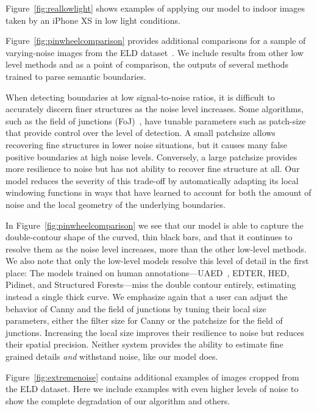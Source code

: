 \documentclass[main.tex]{subfiles}
\begin{document}

Figure~\ref{fig:reallowlight} shows examples of applying our model to indoor images taken by an iPhone XS in low light conditions. 

Figure~\ref{fig:pinwheelcomparison} provides additional comparisons for a sample of varying-noise images from the ELD dataset~\cite{wei2020physicsbased}. We include results from other low level methods and as a point of comparison, the outputs of several methods trained to parse semantic boundaries.

When detecting boundaries at low signal-to-noise ratios, it is difficult to accurately discern finer structures as the noise level increases. Some algorithms, such as the field of junctions (FoJ)~\cite{verbin2021field}, have tunable parameters such as patch-size that provide control over the level of detection. A small patchsize allows recovering fine structures in lower noise situations, but it causes many false positive boundaries at high noise levels. Conversely, a large patchsize provides more resilience to noise but has not ability to recover fine structure at all. Our model reduces the severity of this trade-off by automatically adapting its local windowing functions in ways that have learned to account for both the amount of noise and the local geometry of the underlying boundaries.

In Figure~\ref{fig:pinwheelcomparison} we see that our model is able to capture the double-contour shape of the curved, thin black bars, and that it continues to resolve them as the noise level increases, more than the other low-level methods. We also note that only the low-level models resolve this level of detail in the first place: The models trained on human annotations---UAED~\cite{zhou2023treasure}, EDTER, HED, Pidinet, and Structured Forests---miss the double contour entirely, estimating instead a single thick curve. We emphasize again that a user can adjust the behavior of Canny and the field of junctions by tuning their local size parameters, either the filter size for Canny or the patchsize for the field of junctions. Increasing the local size improves their resilience to noise but reduces their spatial precision. Neither system provides the ability to estimate fine grained details \emph{and} withstand noise, like our model does.

Figure~\ref{fig:extremenoise} contains additional examples of images cropped from the ELD dataset. Here we include examples with even higher levels of noise to show the complete degradation of our algorithm and others. 
\end{document}
